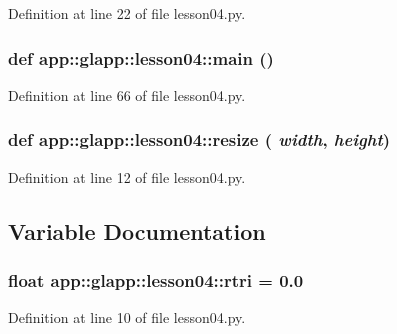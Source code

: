 Definition at line 22 of file lesson04.py.
\subsubsection{\setlength{\rightskip}{0pt plus 5cm}def app::glapp::lesson04::main ()}\label{namespaceapp_1_1glapp_1_1lesson04_dab2c3fd4905ebaa794216a39e9a825a}




Definition at line 66 of file lesson04.py.
\subsubsection{\setlength{\rightskip}{0pt plus 5cm}def app::glapp::lesson04::resize ( {\em width},  {\em height})}\label{namespaceapp_1_1glapp_1_1lesson04_6b9f344099f67b49ae7cbab612c4e6dc}




Definition at line 12 of file lesson04.py.

\subsection{Variable Documentation}
\subsubsection{\setlength{\rightskip}{0pt plus 5cm}float {\bf app::glapp::lesson04::rtri} = 0.0\hspace{0.3cm}{\tt  [static]}}\label{namespaceapp_1_1glapp_1_1lesson04_37a9d65ccbd804d9c9e910b3847daf88}




Definition at line 10 of file lesson04.py.